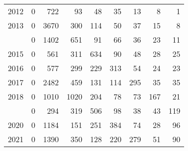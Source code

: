\documentclass[
]{article}
\begin{document}
\begin{longtable}[t]{lrrrrrrrr}
2012 & 0 & 722 & 93 & 48 & 35 & 13 & 8 & 1\\
2013 & 0 & 3670 & 300 & 114 & 50 & 37 & 15 & 8\\
\addlinespace
2014 & 0 & 1402 & 651 & 91 & 66 & 36 & 23 & 11\\
2015 & 0 & 561 & 311 & 634 & 90 & 48 & 28 & 25\\
2016 & 0 & 577 & 299 & 229 & 313 & 54 & 24 & 23\\
2017 & 0 & 2482 & 459 & 131 & 114 & 295 & 35 & 35\\
2018 & 0 & 1010 & 1020 & 204 & 78 & 73 & 167 & 21\\
\addlinespace
2019 & 0 & 294 & 319 & 506 & 98 & 38 & 43 & 119\\
2020 & 0 & 1184 & 151 & 251 & 384 & 74 & 28 & 96\\
2021 & 0 & 1390 & 350 & 128 & 220 & 279 & 51 & 90\\*
\end{longtable}
\end{document}
